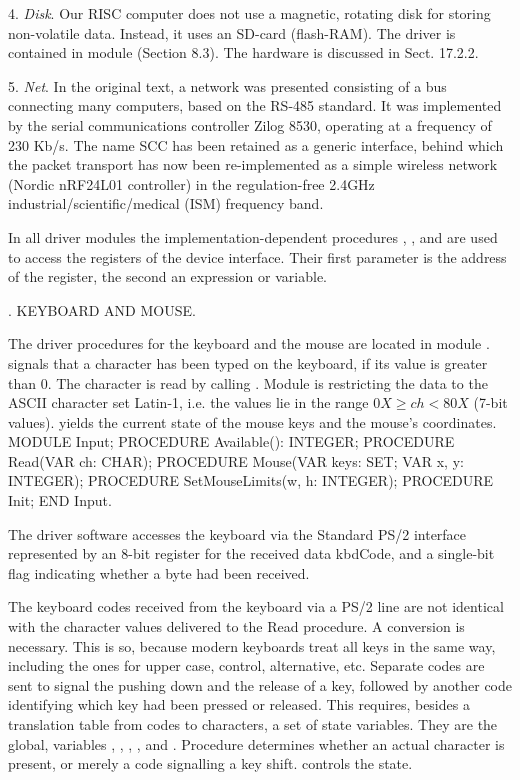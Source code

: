 4. \emph{Disk}. Our RISC computer does not use a magnetic, rotating disk for storing non-volatile data. Instead, it uses an SD-card (flash-RAM). The driver is contained in module  (Section 8.3). The hardware is discussed in Sect. 17.2.2.

5. \emph{Net}. In the original text, a network was presented consisting of a bus connecting many computers, based on the RS-485 standard. It was implemented by the serial communications controller Zilog 8530, operating at a frequency of 230 Kb/s. The name SCC has been retained as a generic interface, behind which the packet transport has now been re-implemented as a simple wireless network (Nordic nRF24L01 controller) in the regulation-free 2.4GHz industrial/scientific/medical (ISM) frequency band.

In all driver modules the implementation-dependent procedures , , and  are used to access the registers of the device interface. Their first parameter is the address of the register, the second an expression or variable.

. KEYBOARD AND MOUSE.

The driver procedures for the keyboard and the mouse are located in module .  signals that a character has been typed on the keyboard, if its value is greater than 0. The character is read by calling . Module  is restricting the data to the ASCII character set Latin-1, i.e. the values lie in the range $0X \ge ch < 80X$ (7-bit values).  yields the current state of the mouse keys and the mouse's coordinates.
\begintt
MODULE Input;
PROCEDURE Available(): INTEGER;
PROCEDURE Read(VAR ch: CHAR);
PROCEDURE Mouse(VAR keys: SET; VAR x, y: INTEGER); PROCEDURE SetMouseLimits(w, h: INTEGER); PROCEDURE Init;
END Input.
\endtt

\noindent The driver software accesses the keyboard via the Standard PS/2 interface represented by an 8-bit register for the received data kbdCode, and a single-bit flag indicating whether a byte had been received.

The keyboard codes received from the keyboard via a PS/2 line are not identical with the character values delivered to the Read procedure. A conversion is necessary. This is so, because modern keyboards treat all keys in the same way, including the ones for upper case, control, alternative, etc. Separate codes are sent to signal the pushing down and the release of a key, followed by another code identifying which key had been pressed or released. This requires, besides a translation table from codes to characters, a set of state variables. They are the global,  variables , , , , and . Procedure  determines whether an actual character is present, or merely a code signalling a key shift.  controls the state.


